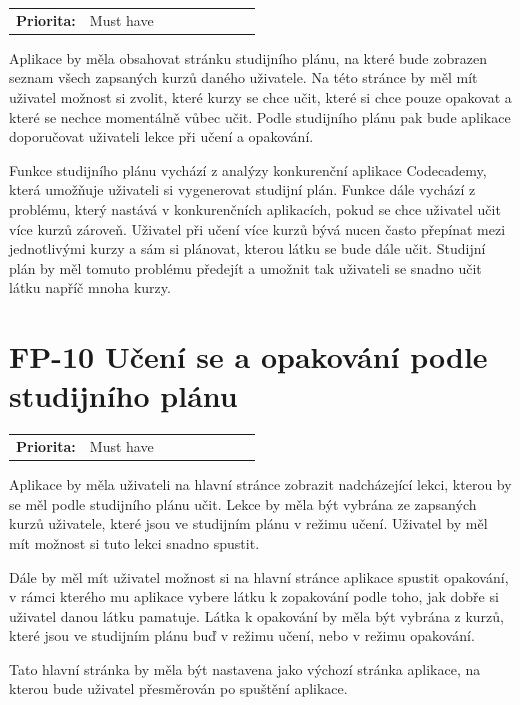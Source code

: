 \begin{tabular}{lp{0.7\linewidth}}
    \textbf{Priorita:} & Must have \\
\end{tabular}

Aplikace by měla obsahovat stránku studijního plánu, na které bude zobrazen seznam všech zapsaných kurzů daného uživatele. Na této stránce by měl mít uživatel možnost si zvolit, které kurzy se chce učit, které si chce pouze opakovat a které se nechce momentálně vůbec učit. Podle studijního plánu pak bude aplikace doporučovat uživateli lekce při učení a opakování.

Funkce studijního plánu vychází z analýzy konkurenční aplikace Codecademy, která umožňuje uživateli si vygenerovat studijní plán. Funkce dále vychází z problému, který nastává v konkurenčních aplikacích, pokud se chce uživatel učit více kurzů zároveň. Uživatel při učení více kurzů bývá nucen často přepínat mezi jednotlivými kurzy a sám si plánovat, kterou látku se bude dále učit. Studijní plán by měl tomuto problému předejít a umožnit tak uživateli se snadno učit látku napříč mnoha kurzy.

\section{FP-10 Učení se a opakování podle studijního plánu}\label{sec:fp-study-plan-learning}

\begin{tabular}{lp{0.7\linewidth}}
    \textbf{Priorita:} & Must have \\
\end{tabular}

Aplikace by měla uživateli na hlavní stránce zobrazit nadcházející lekci, kterou by se měl podle studijního plánu učit. Lekce by měla být vybrána ze zapsaných kurzů uživatele, které jsou ve studijním plánu v režimu učení. Uživatel by měl mít možnost si tuto lekci snadno spustit.

Dále by měl mít uživatel možnost si na hlavní stránce aplikace spustit opakování, v rámci kterého mu aplikace vybere látku k zopakování podle toho, jak dobře si uživatel danou látku pamatuje. Látka k opakování by měla být vybrána z kurzů, které jsou ve studijním plánu buď v režimu učení, nebo v režimu opakování.

Tato hlavní stránka by měla být nastavena jako výchozí stránka aplikace, na kterou bude uživatel přesměrován po spuštění aplikace.

